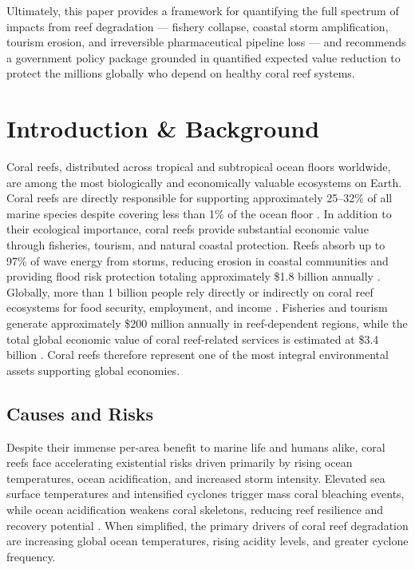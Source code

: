 \documentclass[10pt,letterpaper]{article}
\begin{document}
Ultimately, this paper provides a framework for quantifying the full spectrum of impacts from reef degradation --- fishery collapse, coastal storm amplification, tourism erosion, and irreversible pharmaceutical pipeline loss --- and recommends a government policy package grounded in quantified expected value reduction to protect the millions globally who depend on healthy coral reef systems.

\clearpage

\begingroup
{}
\tableofcontents
\endgroup
\clearpage

\section{Introduction \& Background}

Coral reefs, distributed across tropical and subtropical ocean floors worldwide, are among the most biologically and economically valuable ecosystems on Earth. Coral reefs are directly responsible for supporting approximately 25--32\% of all marine species despite covering less than 1\% of the ocean floor \cite{epa_2025, unep_2025}. In addition to their ecological importance, coral reefs provide substantial economic value through fisheries, tourism, and natural coastal protection. Reefs absorb up to 97\% of wave energy from storms, reducing erosion in coastal communities and providing flood risk protection totaling approximately \$1.8 billion annually \cite{storlazzi_2019}. Globally, more than 1 billion people rely directly or indirectly on coral reef ecosystems for food security, employment, and income \cite{cesar_beukering_2004}. Fisheries and tourism generate approximately \$200 million annually in reef-dependent regions, while the total global economic value of coral reef-related services is estimated at \$3.4 billion \cite{noaa_2026_econ, moberg_folke_1999}. Coral reefs therefore represent one of the most integral environmental assets supporting global economies.

\subsection{Causes and Risks}

Despite their immense per-area benefit to marine life and humans alike, coral reefs face accelerating existential risks driven primarily by rising ocean temperatures, ocean acidification, and increased storm intensity. Elevated sea surface temperatures and intensified cyclones trigger mass coral bleaching events, while ocean acidification weakens coral skeletons, reducing reef resilience and recovery potential \cite{unep_nd, hughes2017, hughes2018}. When simplified, the primary drivers of coral reef degradation are increasing global ocean temperatures, rising acidity levels, and greater cyclone frequency.
\end{document}
